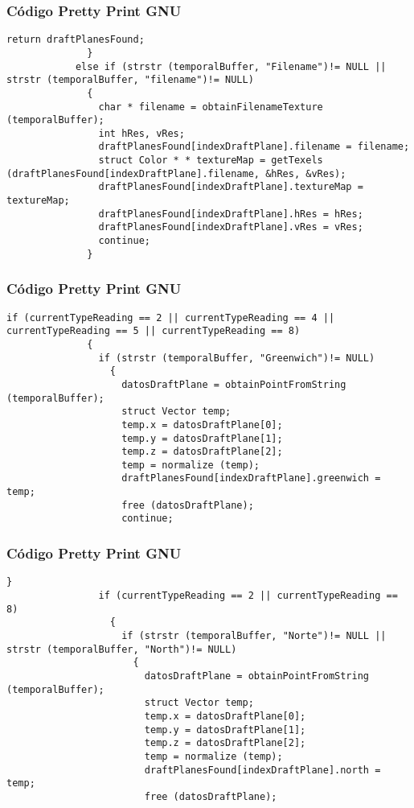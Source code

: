 \documentclass{beamer}
\begin{document}
\begin{frame}[fragile]
\frametitle{C\'odigo Pretty Print GNU}
\begin{lstlisting}[style=CStyle]
                return draftPlanesFound;
              }
            else if (strstr (temporalBuffer, "Filename")!= NULL || strstr (temporalBuffer, "filename")!= NULL)
              {
                char * filename = obtainFilenameTexture (temporalBuffer);
                int hRes, vRes;
                draftPlanesFound[indexDraftPlane].filename = filename;
                struct Color * * textureMap = getTexels (draftPlanesFound[indexDraftPlane].filename, &hRes, &vRes);
                draftPlanesFound[indexDraftPlane].textureMap = textureMap;
                draftPlanesFound[indexDraftPlane].hRes = hRes;
                draftPlanesFound[indexDraftPlane].vRes = vRes;
                continue;
              }
\end{lstlisting}
\end{frame}
\begin{frame}[fragile]
\frametitle{C\'odigo Pretty Print GNU}
\begin{lstlisting}[style=CStyle]
            if (currentTypeReading == 2 || currentTypeReading == 4 || currentTypeReading == 5 || currentTypeReading == 8)
              {
                if (strstr (temporalBuffer, "Greenwich")!= NULL)
                  {
                    datosDraftPlane = obtainPointFromString (temporalBuffer);
                    struct Vector temp;
                    temp.x = datosDraftPlane[0];
                    temp.y = datosDraftPlane[1];
                    temp.z = datosDraftPlane[2];
                    temp = normalize (temp);
                    draftPlanesFound[indexDraftPlane].greenwich = temp;
                    free (datosDraftPlane);
                    continue;
\end{lstlisting}
\end{frame}
\begin{frame}[fragile]
\frametitle{C\'odigo Pretty Print GNU}
\begin{lstlisting}[style=CStyle]
                  }
                if (currentTypeReading == 2 || currentTypeReading == 8)
                  {
                    if (strstr (temporalBuffer, "Norte")!= NULL || strstr (temporalBuffer, "North")!= NULL)
                      {
                        datosDraftPlane = obtainPointFromString (temporalBuffer);
                        struct Vector temp;
                        temp.x = datosDraftPlane[0];
                        temp.y = datosDraftPlane[1];
                        temp.z = datosDraftPlane[2];
                        temp = normalize (temp);
                        draftPlanesFound[indexDraftPlane].north = temp;
                        free (datosDraftPlane);
\end{lstlisting}
\end{frame}
\end{document}
